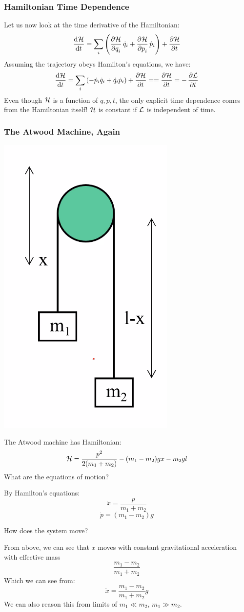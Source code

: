 \documentclass[../PHYS306Notes.tex]{subfiles}
\begin{document}
\subsubsection{Hamiltonian Time Dependence}
Let us now look at the time derivative of the Hamiltonian:
\[\dod{\mathcal{H}}{t} = \sum_i\left(\dpd{\mathcal{H}}{q_i}\dot{q}_i + \dpd{\HH}{p_i}\dot{p}_i\right)  + \dpd{\HH}{t}\]
Assuming the trajectory obeys Hamilton's equations, we have:
\[\dod{\mathcal{H}}{t} = \sum_i\left(-\dot{p}_i\dot{q}_i + \dot{q}_i\dot{p}_i\right) + \dpd{\HH}{t} = = \dpd{\HH}{t} = - \dpd{\LL}{t} \]
Even though $\mathcal{H}$ is a function of $q, p, t$, the only explicit time dependence comes from the Hamiltonian itself! $\mathcal{H}$ is constant if $\mathcal{L}$ is independent of time.

\subsubsection{The Atwood Machine, Again}
\begin{center}
    \includegraphics[scale=0.5]{Lecture-23/l23-img1.png}
\end{center}
The Atwood machine has Hamiltonian:
\[\mathcal{H} = \frac{p^2}{2(m_1 + m_2)} - (m_1 - m_2)gx - m_2gl\]
What are the equations of motion?
\begin{s}
By Hamilton's equations:
\[\dot{x} = \frac{p}{m_1 + m_2}\]
\[\dot{p} = (m_1 - m_2)g\]
\end{s}
How does the system move?
\begin{s}
From above, we can see that $x$ moves with constant gravitational acceleration with effective mass \[\frac{m_1 - m_2}{m_1 + m_2}\]
Which we can see from:
\[\ddot{x} = \frac{m_1 - m_2}{m_1 + m_2}g\]
We can also reason this from limits of $m_1 \ll m_2$, $m_1 \gg m_2$.
\end{s}
\end{document}
